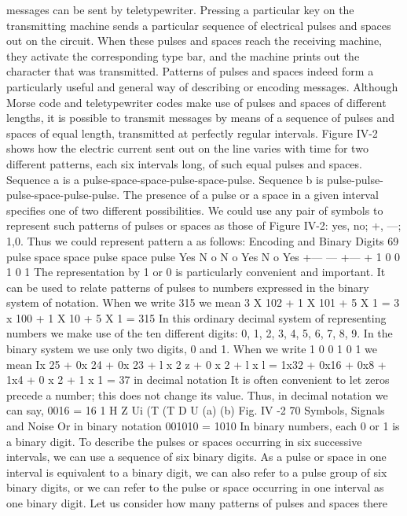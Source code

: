 messages can be sent by teletypewriter. Pressing a particular key
on the transmitting machine sends a particular sequence of electrical
pulses and spaces out on the circuit. When these pulses and
spaces reach the receiving machine, they activate the corresponding
type bar, and the machine prints out the character that was transmitted.
Patterns of pulses and spaces indeed form a particularly useful
and general way of describing or encoding messages. Although
Morse code and teletypewriter codes make use of pulses and spaces
of different lengths, it is possible to transmit messages by means
of a sequence of pulses and spaces of equal length, transmitted at
perfectly regular intervals. Figure IV-2 shows how the electric
current sent out on the line varies with time for two different
patterns, each six intervals long, of such equal pulses and spaces.
Sequence a is a pulse-space-space-pulse-space-pulse. Sequence b
is pulse-pulse-pulse-space-pulse-pulse.
The presence of a pulse or a space in a given interval specifies
one of two different possibilities. We could use any pair of symbols
to represent such patterns of pulses or spaces as those of Figure
IV-2: yes, no; +, —; 1,0. Thus we could represent pattern a as
follows:
Encoding and Binary Digits 69
pulse space space pulse space pulse
Yes N o N o Yes N o Yes
+—
— +— +
1 0 0 1 0 1
The representation by 1 or 0 is particularly convenient and
important. It can be used to relate patterns of pulses to numbers
expressed in the binary system of notation.
When we write 315 we mean
3 X 102 + 1 X 101 + 5 X 1
= 3 x 100 + 1 X 10 + 5 X 1
= 315
In this ordinary decimal system of representing numbers we make
use of the ten different digits: 0, 1, 2, 3, 4, 5, 6, 7, 8, 9. In the
binary system we use only two digits, 0 and 1. When we write 1 0
0 1 0 1 we mean
Ix 25 + 0x 24 + 0x 23 + l x 2 z + 0 x 2 + l x l
= 1x32 + 0x16 + 0x8 + 1x4 + 0 x 2 + 1 x 1
= 37 in decimal notation
It is often convenient to let zeros precede a number; this does
not change its value. Thus, in decimal notation we can say,
0016 = 16
1
H
Z Ui (T (T D U
(a)
(b)
Fig. IV -2
70 Symbols, Signals and Noise
Or in binary notation
001010 = 1010
In binary numbers, each 0 or 1 is a binary digit. To describe the
pulses or spaces occurring in six successive intervals, we can use
a sequence of six binary digits. As a pulse or space in one interval
is equivalent to a binary digit, we can also refer to a pulse group
of six binary digits, or we can refer to the pulse or space occurring
in one interval as one binary digit.
Let us consider how many patterns of pulses and spaces there
